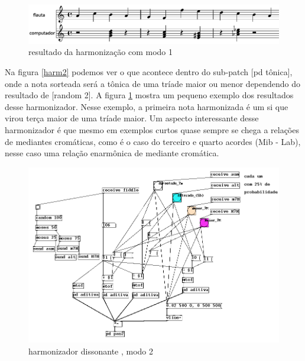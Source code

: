 \documentclass{ppgmus}
\begin{document}
\begin{figure}[!ht]
\includegraphics[scale=.4]{harm3}
\caption{resultado da harmonização com modo 1}
\label{harm3}
\end{figure}


Na figura \ref{harm2} podemos ver o que acontece dentro do sub-patch [pd tônica], onde a nota sorteada 
será a tônica de uma tríade maior ou menor dependendo do resultado de [random 2]. A figura \ref{harm3} 
mostra um pequeno exemplo dos resultados desse harmonizador. Nesse exemplo, a primeira nota 
harmonizada é um si que virou terça maior de uma tríade maior. Um aspecto interessante desse 
harmonizador é que mesmo em exemplos curtos quase sempre se chega a relações de mediantes 
cromáticas, como é o caso do terceiro e quarto acordes (Mib - Lab), nesse caso uma relação 
enarmônica de mediante cromática.

\begin{figure}[!ht]
\includegraphics[scale=.5]{harm4}
\caption{harmonizador dissonante , modo 2}
\label{harm4}
\end{figure}
\end{document}
